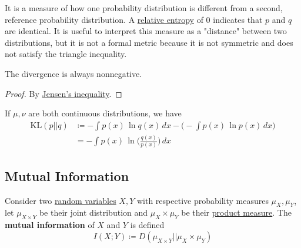   It is a measure of how one probability distribution is different from a second, reference probability distribution. A \hyperref[def:relative-entropy]{relative entropy} of $0$ indicates that $p$ and $q$ are identical. It is useful to interpret this measure as a "distance" between two distributions, but it is not a formal metric because it is not symmetric and does not satisfy the triangle inequality. 

  \begin{lemma}[]
    \label{thm:divergence-always-nonnegative}
    The divergence is always nonnegative. 
  \end{lemma}
  \begin{proof}
    By \hyperref[com-thm:jensens-inequality]{Jensen's inequality}. 
  \end{proof}

  \begin{example}
    \label{ex:kl-divergence-between-continuous-distributions}
    If $\mu, \nu$ are both continuous distributions, we have
    \begin{align}
      \mathrm{KL}(p || q) & \coloneqq - \int p(x) \, \ln{q(x)} \,dx - \bigg( - \int p(x) \, \ln{p(x)} \,dx \bigg) \\
      & = - \int p(x) \, \ln \bigg( \frac{q(x)}{p(x)} \bigg) \,dx 
    \end{align}
  \end{example}

\subsection{Mutual Information} 

  \begin{definition}
    \label{def:mutual-information}
    Consider two \hyperref[prob-def:random-variable]{random variables} $X, Y$ with respective probability measures $\mu_X, \mu_Y$, let $\mu_{X \times Y}$ be their joint distribution and $\mu_X \times \mu_Y$ be their \hyperref[mt-def:product-measure]{product measure}. The \textbf{mutual information} of $X$ and $Y$ is defined 
    \begin{equation}
      I(X; Y) \coloneqq D(\mu_{X \times Y} || \mu_X \times \mu_Y) 
    \end{equation}
  \end{definition}

